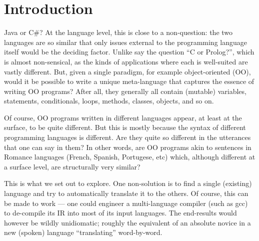 \documentclass[sigplan,review,anonymous,prologue,dvipsnames]{acmart}
\newcommand{\Csharp}{C\#}
\begin{document}




\maketitle


\section{Introduction}

Java or \Csharp? At the language level, this is close to a 
non-question: the two languages are so similar that only issues
external to the programming language itself would be the 
deciding factor.  Unlike say the question ``C or Prolog?'', which
is almost non-sensical, as the kinds of applications where each
is well-suited are vastly different.  But, given a single
paradigm, for example object-oriented (OO), would it be possible to
write a unique meta-language that captures the essence of writing
OO programs?  After all, they generally all contain (mutable)
variables, statements, conditionals, loops, methods, classes, objects,
and so on.

Of course, OO programs written in different languages appear, at
least at the surface, to be quite different. But this is mostly because
the syntax of different programming languages is different. Are they
quite so different in the utterances that one can say in them? In other
words, are OO programs akin to sentences in Romance languages
(French, Spanish, Portugese, etc) which, although different at a
surface level, are structurally very similar?

This is what we set out to explore.  One non-solution is to find a single
(existing) language and try to automatically translate it to the others.
Of course, this can be made to work --- one could
engineer a multi-language compiler (such as gcc) to de-compile its
IR into most of its input languages.  The end-results would however
be wildly unidiomatic; roughly the equivalent of an absolute novice
in a new (spoken) language ``translating'' word-by-word.
\end{document}
